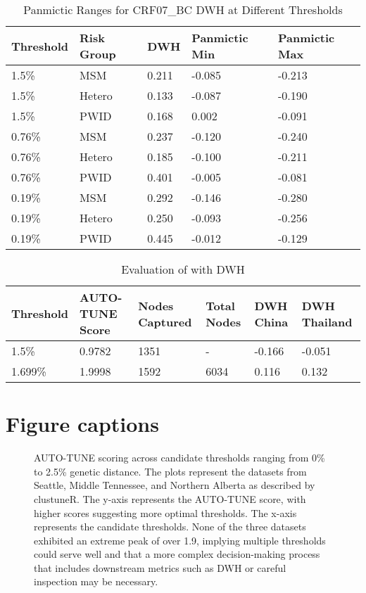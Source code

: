 \documentclass[utf8]{FrontiersinHarvard} %
\begin{document}
\begin{table}[h!]
\centering
\begin{tabularx}{\textwidth}{|X|X|X|X|X|}
\hline
Threshold & Risk Group & DWH & Panmictic Min & Panmictic Max \\
\hline
1.5\% & MSM & 0.211 & -0.085 & -0.213 \\
1.5\% & Hetero & 0.133 & -0.087 & -0.190 \\
1.5\% & PWID & 0.168 & 0.002 & -0.091 \\
\hline
0.76\% & MSM & 0.237 & -0.120 & -0.240 \\
0.76\% & Hetero & 0.185 & -0.100 & -0.211 \\
0.76\% & PWID & 0.401 & -0.005 & -0.081 \\
\hline
0.19\% & MSM & 0.292 & -0.146 & -0.280 \\
0.19\% & Hetero & 0.250 & -0.093 & -0.256 \\
0.19\% & PWID & 0.445 & -0.012 & -0.129 \\
\hline
\end{tabularx}
\caption{Panmictic Ranges for CRF07\_BC DWH at Different Thresholds}
\label{table:panmictic}
\end{table}

\begin{table}[h!]
\centering
\begin{tabularx}{\textwidth}{|X|X|X|X|X|X|}
\hline
Threshold & AUTO-TUNE Score & Nodes Captured & Total Nodes & DWH China & DWH Thailand \\
\hline
1.5\% & 0.9782 & 1351 & - & -0.166 & -0.051 \\
1.699\% & 1.9998 & 1592 & 6034 & 0.116 & 0.132 \\
\hline
\end{tabularx}
\caption{Evaluation of \citep{rhee_national_2019} with DWH}
\label{table:rhee}
\end{table}


\section{Figure captions}

\begin{figure}[h!]
	\caption{ AUTO-TUNE scoring across candidate thresholds ranging from 0\% to
		2.5\% genetic distance. The plots represent the datasets from Seattle, Middle
		Tennessee, and Northern Alberta as described by clustuneR. The y-axis
		represents the AUTO-TUNE score, with higher scores suggesting more optimal
		thresholds. The x-axis represents the candidate thresholds. None of the three
		datasets exhibited an extreme peak of over 1.9, implying multiple thresholds
		could serve well and that a more complex decision-making process that
		includes downstream metrics such as DWH or careful inspection may be
		necessary.}\label{fig:clustuner}
\end{figure}
\end{document}
